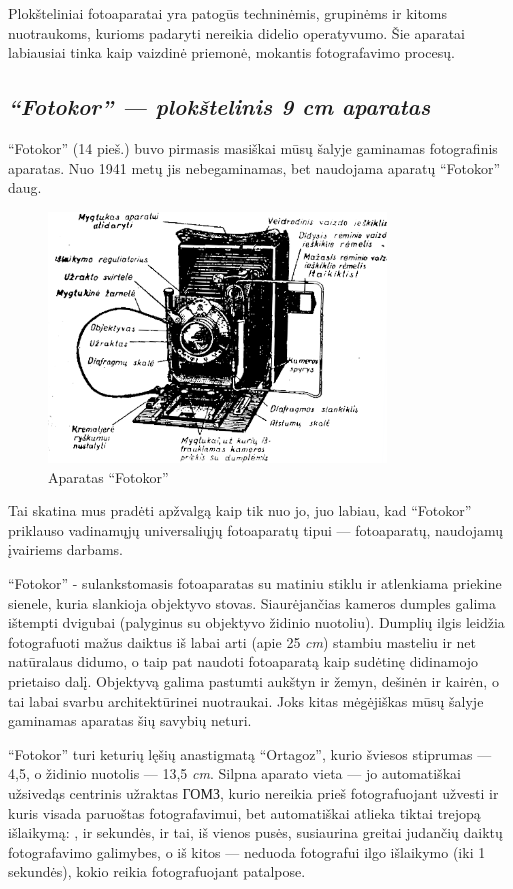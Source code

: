 \documentclass[12pt]{book}
\begin{document}
			Plokšteliniai fotoaparatai yra patogūs techninėmis, grupinėms ir kitoms nuotraukoms, kurioms padaryti nereikia didelio operatyvumo. Šie aparatai labiausiai tinka kaip vaizdinė priemonė, mokantis fotografavimo procesų.
		\subsection*{\textit{``Fotokor'' --- plokštelinis 9  cm aparatas}}
			``Fotokor'' (14 pieš.) buvo pirmasis masiškai mūsų šalyje gaminamas fotografinis aparatas. Nuo 1941 metų jis nebegaminamas, bet naudojama aparatų ``Fotokor'' daug.
			\begin{figure}[h]
				\centering
				\includegraphics[width=0.8\textwidth]{14-pav}
				\caption{Aparatas ``Fotokor''}
				\label{fig:14}
			\end{figure} 
			Tai skatina mus pradėti apžvalgą kaip tik nuo jo, juo labiau, kad ``Fotokor'' priklauso vadinamųjų universaliųjų fotoaparatų tipui --- fotoaparatų, naudojamų įvairiems darbams.

			``Fotokor'' - sulankstomasis fotoaparatas su matiniu stiklu ir atlenkiama priekine sienele, kuria slankioja objektyvo stovas. Siaurėjančias kameros dumples galima ištempti dvigubai (palyginus su objektyvo židinio nuotoliu). Dumplių ilgis leidžia fotografuoti mažus daiktus iš labai arti (apie 25 \textit{cm}) stambiu masteliu ir net natūralaus didumo, o taip pat naudoti fotoaparatą kaip sudėtinę didinamojo prietaiso dalį. Objektyvą galima pastumti aukštyn ir žemyn, dešinėn ir kairėn, o tai labai svarbu architektūrinei nuotraukai. Joks kitas mėgėjiškas mūsų šalyje gaminamas aparatas šių savybių neturi.

			``Fotokor'' turi keturių lęšių anastigmatą ``Ortagoz'', kurio šviesos stiprumas --- 4,5, o židinio nuotolis --- 13,5 \textit{cm}. Silpna aparato vieta --- jo automatiškai užsivedąs centrinis užraktas \foreignlanguage{russian}{ГОМЗ}, kurio nereikia prieš fotografuojant užvesti ir kuris visada paruoštas fotografavimui, bet automatiškai atlieka tiktai trejopą išlaikymą: ,  ir  sekundės, ir tai, iš vienos pusės, susiaurina greitai judančių daiktų fotografavimo galimybes, o iš kitos --- neduoda fotografui ilgo išlaikymo (iki 1 sekundės), kokio reikia fotografuojant patalpose.
\end{document}
